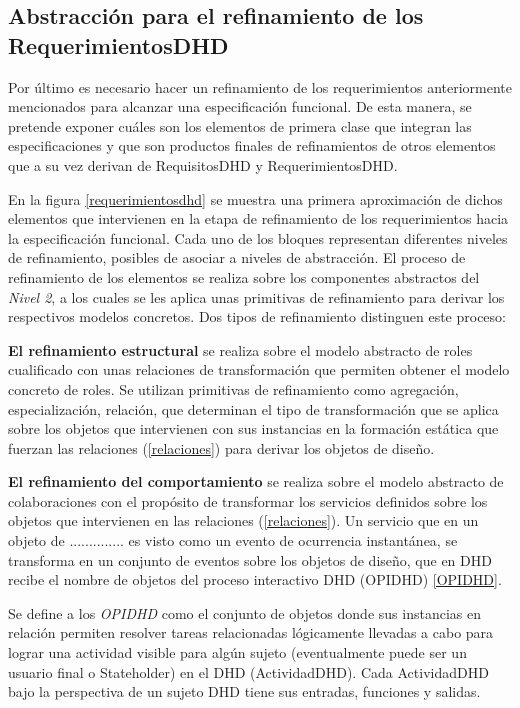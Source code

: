 \begin{descrition}
\subsection{Abstracción para el refinamiento de los RequerimientosDHD}

Por último es necesario hacer un refinamiento de los requerimientos
anteriormente mencionados para alcanzar una especificación funcional. De esta
manera, se pretende exponer cuáles son los elementos de primera clase que
integran las especificaciones y que son productos finales de refinamientos de
otros elementos que a su vez derivan de RequisitosDHD y RequerimientosDHD.

En la figura \ref{requerimientosdhd} se muestra una primera aproximación de
dichos elementos que intervienen en la etapa de refinamiento de los
requerimientos hacia la especificación funcional. Cada uno de los bloques
representan diferentes niveles de refinamiento, posibles de asociar a niveles de abstracción. El proceso de refinamiento de los
elementos se realiza sobre los componentes abstractos del \textit{Nivel 2}, 
a los cuales se les aplica unas primitivas de refinamiento para derivar los
respectivos modelos concretos. Dos tipos de refinamiento distinguen este
proceso:  

\begin{definition}
\item [\textbf{El refinamiento estructural}] se realiza sobre el modelo
abstracto de roles cualificado con unas relaciones de transformación que
permiten obtener el modelo concreto de roles. Se utilizan primitivas de
refinamiento como agregación, especialización, relación, que determinan el tipo
de transformación que se aplica sobre los objetos que intervienen con sus
instancias en la formación estática que fuerzan las relaciones
(\ref{relaciones}) para derivar los objetos de diseño. 

\item [\textbf{El refinamiento del comportamiento}] se realiza sobre el modelo
abstracto de colaboraciones con el propósito de transformar los servicios
definidos sobre los objetos que intervienen en las relaciones
(\ref{relaciones}). Un servicio que en un objeto de .............. es visto como un
evento de ocurrencia instantánea, se transforma en un conjunto de eventos sobre
los objetos de diseño, que en DHD recibe el nombre de objetos del proceso
interactivo DHD (OPIDHD) \ref{OPIDHD}.


\begin{defi} [OPIDHD] Se define a los \textit{OPIDHD} como el conjunto de objetos
donde sus instancias en relación permiten resolver tareas relacionadas
lógicamente llevadas a cabo para lograr una actividad visible para algún sujeto
(eventualmente puede ser un usuario final o Stateholder) en el
DHD (ActividadDHD). Cada ActividadDHD bajo la perspectiva de un sujeto DHD tiene
sus entradas, funciones y salidas.
\end{defi} \label{OPIDHD}




\end{definition}
\end{descrition}
